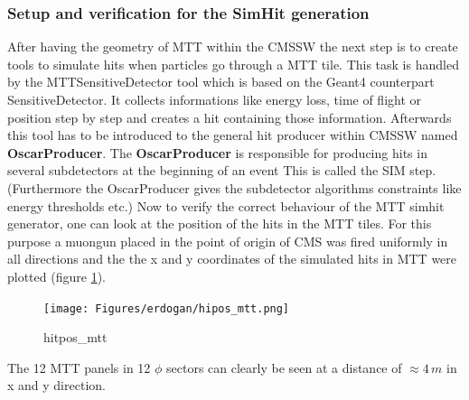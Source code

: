 		\subsubsection{Setup and verification for the SimHit generation}
			After having the geometry of MTT within the CMSSW the next step is to create tools to simulate hits when particles go through a MTT tile.
			This task is handled by the MTTSensitiveDetector tool which is based on the Geant4 counterpart SensitiveDetector.
			It collects informations like energy loss, time of flight or position step by step and creates a hit containing those information.
			Afterwards this tool has to be introduced to the general hit producer within CMSSW named \textbf{OscarProducer}.
			The \textbf{OscarProducer} is responsible for producing hits in several subdetectors at the beginning of an event
			This is called the SIM step.
			(Furthermore the OscarProducer gives the subdetector algorithms constraints like energy thresholds etc.)
			Now to verify the correct behaviour of the MTT simhit generator, one can look at the position of the hits in the MTT tiles.
			For this purpose a muongun placed in the point of origin of CMS was fired uniformly in all directions and the the x and y coordinates of the simulated hits in MTT were plotted (figure
			\ref{fig:hitpos_mtt}).
			\begin{figure}[htbp]
				\centering
				\texttt{[image: Figures/erdogan/hipos\_mtt.png]}
				\caption{hitpos_mtt}
				\label{fig:hitpos_mtt}
			\end{figure}
			The 12 MTT panels in 12 $\phi$ sectors can clearly be seen at a distance of $\approx4\,m$ in x and y direction.
